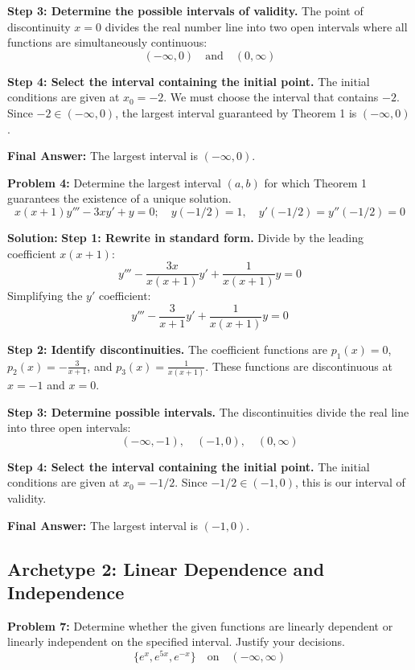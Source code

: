 \documentclass[11pt,letterpaper]{article}
\begin{document}
\textbf{Step 3: Determine the possible intervals of validity.}
The point of discontinuity $x = 0$ divides the real number line into two open intervals where all functions are simultaneously continuous:
\[ (-\infty, 0) \quad \text{and} \quad (0, \infty) \]

\textbf{Step 4: Select the interval containing the initial point.}
The initial conditions are given at $x_0 = -2$. We must choose the interval that contains $-2$.
Since $-2 \in (-\infty, 0)$, the largest interval guaranteed by Theorem 1 is $(-\infty, 0)$.

\textbf{Final Answer:} The largest interval is $(-\infty, 0)$.

\vspace{0.5cm}

\textbf{Problem 4:} Determine the largest interval $(a,b)$ for which Theorem 1 guarantees the existence of a unique solution.
\[ x(x+1)y''' - 3xy' + y = 0; \quad y(-1/2) = 1, \quad y'(-1/2) = y''(-1/2) = 0 \]

\textbf{Solution:}
\textbf{Step 1: Rewrite in standard form.}
Divide by the leading coefficient $x(x+1)$:
\[ y''' - \frac{3x}{x(x+1)}y' + \frac{1}{x(x+1)}y = 0 \]
Simplifying the $y'$ coefficient:
\[ y''' - \frac{3}{x+1}y' + \frac{1}{x(x+1)}y = 0 \]

\textbf{Step 2: Identify discontinuities.}
The coefficient functions are $p_1(x) = 0$, $p_2(x) = -\frac{3}{x+1}$, and $p_3(x) = \frac{1}{x(x+1)}$.
These functions are discontinuous at $x = -1$ and $x = 0$.

\textbf{Step 3: Determine possible intervals.}
The discontinuities divide the real line into three open intervals:
\[ (-\infty, -1), \quad (-1, 0), \quad (0, \infty) \]

\textbf{Step 4: Select the interval containing the initial point.}
The initial conditions are given at $x_0 = -1/2$. 
Since $-1/2 \in (-1, 0)$, this is our interval of validity.

\textbf{Final Answer:} The largest interval is $(-1, 0)$.

\subsection{Archetype 2: Linear Dependence and Independence}

\textbf{Problem 7:} Determine whether the given functions are linearly dependent or linearly independent on the specified interval. Justify your decisions.
\[ \{e^x, e^{5x}, e^{-x}\} \quad \text{on} \quad (-\infty, \infty) \]
\end{document}
